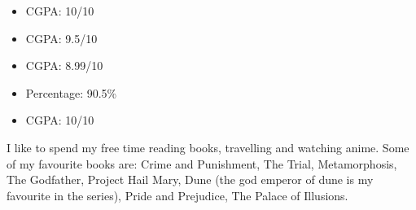 
\begin{itemize}
    \item CGPA: 10/10
\end{itemize} 
\divider

\begin{itemize}
    \item CGPA: 9.5/10
\end{itemize} 
\divider

\begin{itemize}
    \item CGPA: 8.99/10
\end{itemize} 
\divider

\begin{itemize}
    \item Percentage: 90.5\%
\end{itemize}
\divider

\begin{itemize}
    \item CGPA: 10/10
\end{itemize}
\smallskip


I like to spend my free time reading books, travelling and watching anime.
Some of my favourite books are: Crime and Punishment, The Trial, Metamorphosis, The Godfather, Project Hail Mary, Dune (the god emperor of dune is my favourite in the series), Pride and Prejudice, The Palace of Illusions.
